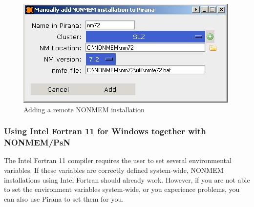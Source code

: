 \begin{figure}[h] \centering
    \includegraphics[scale=.5]{images/addnonmem_3.jpg}
    \caption{Adding a remote NONMEM installation\label{fig:Fig3}}
\end{figure}

\subsubsection*{Using Intel Fortran 11 for Windows together with NONMEM/PsN}
The Intel Fortran 11 compiler requires the user to set several
environmental variables. If these variables are correctly defined
system-wide, NONMEM installations using Intel Fortran should already
work. However, if you are not able to set the environment variables
system-wide, or you experience problems, you can also use Pirana to
set them for you.


